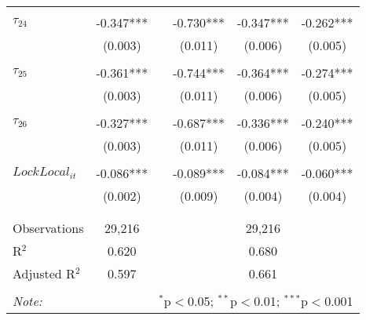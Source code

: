 \begin{tabular}{@{\extracolsep{-5pt}}lccccc}
                &           &&           &           &           \\[-2.1ex]
$\tau_{24}$     & -0.347*** && -0.730*** & -0.347*** & -0.262*** \\
                &  (0.003)  &&  (0.011)  &  (0.006)  &  (0.005)  \\
                &           &&           &           &           \\[-2.1ex]
$\tau_{25}$     & -0.361*** && -0.744*** & -0.364*** & -0.274*** \\
                &  (0.003)  &&  (0.011)  &  (0.006)  &  (0.005)  \\
                &           &&           &           &           \\[-2.1ex]
$\tau_{26}$     & -0.327*** && -0.687*** & -0.336*** & -0.240*** \\
                &  (0.003)  &&  (0.011)  &  (0.006)  &  (0.005)  \\
                &           &&           &           &           \\[-1.ex]
$LockLocal_{it}$ & -0.086*** && -0.089*** & -0.084*** & -0.060*** \\
                &  (0.002)  &&  (0.009)  &  (0.004)  &  (0.004)  \\
                &           &&           &           &           \\[-2.1ex]
\hline \\[-1.8ex] 
Observations     & 29,216 && \multicolumn{3}{c}{29,216} \\ 
R$^{2}$          &  0.620 && \multicolumn{3}{c}{0.680 } \\ 
Adjusted R$^{2}$ &  0.597 && \multicolumn{3}{c}{0.661 } \\ 
\hline 
\hline \\[-1.8ex] 
\textit{Note:}  & \multicolumn{5}{r}{$^{*}$p$<$0.05; $^{**}$p$<$0.01; $^{***}$p$<$0.001} \\ 
\end{tabular} 